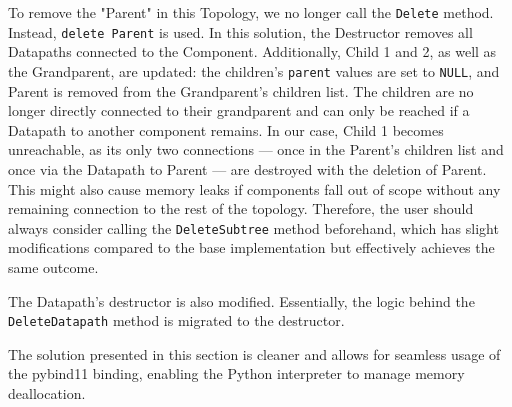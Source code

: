 To remove the "Parent" in this Topology, we no longer call the \verb|Delete| method. Instead, \verb|delete Parent| is used. In this solution, the Destructor removes all Datapaths connected to the Component. Additionally, Child 1 and 2, as well as the Grandparent, are updated: the children's \verb|parent| values are set to \texttt{NULL}, and Parent is removed from the Grandparent's children list. The children are no longer directly connected to their grandparent and can only be reached if a Datapath to another component remains. In our case, Child 1 becomes unreachable, as its only two connections — once in the Parent's children list and once via the Datapath to Parent — are destroyed with the deletion of Parent. This might also cause memory leaks if components fall out of scope without any remaining connection to the rest of the topology. Therefore, the user should always consider calling the \verb|DeleteSubtree| method beforehand, which has slight modifications compared to the base implementation but effectively achieves the same outcome.

The Datapath's destructor is also modified. Essentially, the logic behind the \verb|DeleteDatapath| method is migrated to the destructor.

The solution presented in this section is cleaner and allows for seamless usage of the pybind11 binding, enabling the Python interpreter to manage memory deallocation.